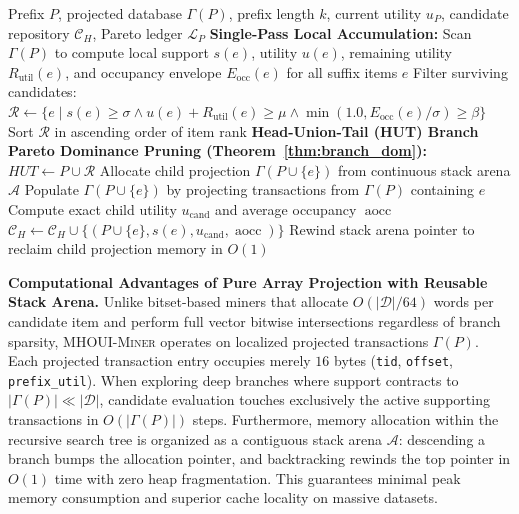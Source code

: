 \documentclass[runningheads]{llncs}
\newcommand{\MHOUIminer}{\textsc{MHOUI-Miner}}
\begin{document}
\begin{algorithm}[htbp]
\caption{\textsc{MHOUI-Search}}
\label{alg:mhoui_search}
\begin{algorithmic}[1]
\Require Prefix $P$, projected database $\Gamma(P)$, prefix length $k$, current utility $u_P$, candidate repository $\mathcal{C}_H$, Pareto ledger $\mathcal{L}_P$
\State \textbf{Single-Pass Local Accumulation:}
\State Scan $\Gamma(P)$ to compute local support $s(e)$, utility $u(e)$, remaining utility $R_{\text{util}}(e)$, and occupancy envelope $E_{\text{occ}}(e)$ for all suffix items $e$
\State Filter surviving candidates: $\mathcal{R} \gets \{e \mid s(e) \ge \sigma \land u(e) + R_{\text{util}}(e) \ge \mu \land \min(1.0, E_{\text{occ}}(e)/\sigma) \ge \beta\}$
 \Return \EndIf
\State Sort $\mathcal{R}$ in ascending order of item rank
\State \textbf{Head-Union-Tail (HUT) Branch Pareto Dominance Pruning (Theorem~\ref{thm:branch_dom}):}
\State $HUT \gets P \cup \mathcal{R}$
    \State \Return {}
\EndIf
{}
    \State Allocate child projection $\Gamma(P \cup \{e\})$ from continuous stack arena $\mathcal{A}$
    \State Populate $\Gamma(P \cup \{e\})$ by projecting transactions from $\Gamma(P)$ containing $e$
    \State Compute exact child utility $u_{\text{cand}}$ and average occupancy $\operatorname{aocc}$
        \State $\mathcal{C}_H \gets \mathcal{C}_H \cup \{(P \cup \{e\}, s(e), u_{\text{cand}}, \operatorname{aocc})\}$
        \State {}
    \EndIf
        \State {}
    \EndIf
    \State Rewind stack arena pointer to reclaim child projection memory in $O(1)$
\EndFor
\end{algorithmic}
\end{algorithm}

\noindent
\textbf{Computational Advantages of Pure Array Projection with Reusable Stack Arena.}
Unlike bitset-based miners that allocate $O(|\mathcal{D}|/64)$ words per candidate item and perform full vector bitwise intersections regardless of branch sparsity, \MHOUIminer{} operates on localized projected transactions $\Gamma(P)$.
Each projected transaction entry occupies merely $16$ bytes (\texttt{tid}, \texttt{offset}, \texttt{prefix\_util}).
When exploring deep branches where support contracts to $|\Gamma(P)| \ll |\mathcal{D}|$, candidate evaluation touches exclusively the active supporting transactions in $O(|\Gamma(P)|)$ steps.
Furthermore, memory allocation within the recursive search tree is organized as a contiguous stack arena $\mathcal{A}$: descending a branch bumps the allocation pointer, and backtracking rewinds the top pointer in $O(1)$ time with zero heap fragmentation.
This guarantees minimal peak memory consumption and superior cache locality on massive datasets.
\end{document}
